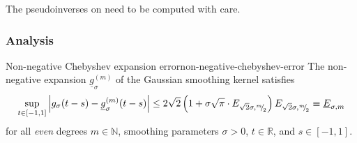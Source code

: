 \documentclass[12pt]{article}
\begin{document}


The pseudoinverses on  need to be computed with care.


\subsubsection{Analysis}
\label{subsubsec:chebyshev-nystrom-analysis}

\begin{lemma}{Non-negative Chebyshev expansion error}{non-negative-chebyshev-error}
    The non-negative expansion $\underline{g}_{\sigma}^{(m)}$ of the Gaussian smoothing kernel satisfies
    \begin{equation}
        \sup_{t \in [-1, 1]} \left| g_{\sigma}(t - s) - \underline{g}_{\sigma}^{(m)}(t - s) \right| \leq 2\sqrt{2} \left(1 + \sigma \sqrt{\pi} \cdot E_{\sqrt{2}\sigma, {}^{m}{\mskip -5mu/\mskip -3mu}_{2}}\right) E_{\sqrt{2}\sigma, {}^{m}{\mskip -5mu/\mskip -3mu}_{2}} \equiv \underline{E}_{\sigma, m}
        \label{equ:2-chebyshev-interpolation-sup-error-kernel}
    \end{equation}
    for all \emph{even} degrees $m \in \mathbb{N}$, smoothing parameters $\sigma > 0$, $t \in \mathbb{R}$, and $s \in [-1, 1]$.
\end{lemma}
\end{document}

